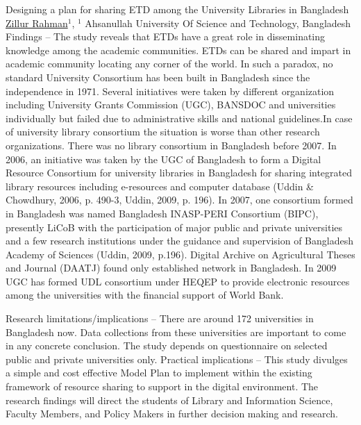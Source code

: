 \begin{abstract_online}{Designing a plan for sharing ETD among the University Libraries in Bangladesh}{%
        \underline{Zillur Rahman}$^{1}$,{%
        }{%
        $^1$ Ahsanullah University Of Science and Technology, Bangladesh}
            }
         Findings – The study reveals that ETDs have a great role in disseminating knowledge among the academic communities. ETDs can be shared and impart in academic community locating any corner of the world. In such a paradox, no standard University Consortium has been built in Bangladesh since the independence in 1971. Several initiatives were taken by different organization including University Grants Commission (UGC), BANSDOC and universities individually but failed due to administrative skills and national guidelines.In case of university library consortium the situation is worse than other research organizations. There was no library consortium in Bangladesh before 2007. In 2006, an initiative was taken by the UGC of Bangladesh to form a Digital Resource Consortium for university libraries in Bangladesh for sharing integrated library resources including e-resources and computer database (Uddin & Chowdhury, 2006, p. 490-3, Uddin, 2009, p. 196). In 2007, one consortium formed in Bangladesh was named Bangladesh INASP-PERI Consortium (BIPC), presently LiCoB with the participation of major public and private universities and a few research institutions under the guidance and supervision of Bangladesh Academy of Sciences (Uddin, 2009, p.196). Digital Archive on Agricultural Theses and Journal (DAATJ) found only established network in Bangladesh.  In 2009 UGC has formed UDL consortium under HEQEP to provide electronic resources among the universities with the financial support of World Bank.   
       
         Research limitations/implications – There are around 172 universities in Bangladesh now. Data collections from these universities are important to come in any concrete conclusion. The study depends on questionnaire on selected public and private universities only.  Practical implications – This study divulges a simple and cost effective Model Plan to implement within the existing framework of resource sharing to support in the digital environment. The research findings will direct the students of Library and Information Science, Faculty Members, and Policy Makers in further decision making and research. 
    \end{abstract_online}
    
